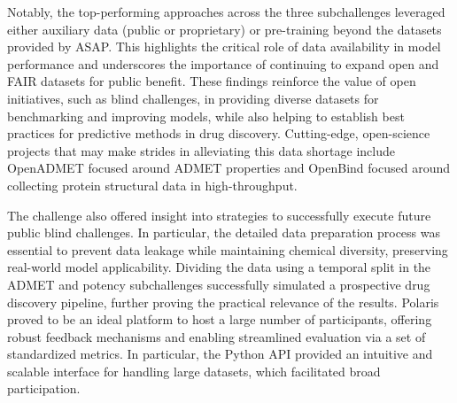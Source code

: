 \documentclass[journal=jcim,manuscript=article]{achemso}
\begin{document}
Notably, the top-performing approaches across the three subchallenges leveraged either auxiliary data (public or proprietary) or pre-training beyond the datasets provided by ASAP. This highlights the critical role of data availability in model performance and underscores the importance of continuing to expand open and FAIR\cite{wilkinson_fair_2016} datasets for public benefit. These findings reinforce the value of open initiatives, such as blind challenges, in providing diverse datasets for benchmarking and improving models, while also helping to establish best practices for predictive methods in drug discovery. Cutting-edge, open-science projects that may make strides in alleviating this data shortage include OpenADMET focused around ADMET properties and OpenBind focused around collecting protein structural data in high-throughput.

The challenge also offered insight into strategies to successfully execute future public blind challenges. In particular, the detailed data preparation process was essential to prevent data leakage while maintaining chemical diversity, preserving real-world model applicability. Dividing the data using a temporal split in the ADMET and potency subchallenges successfully simulated a prospective drug discovery pipeline, further proving the practical relevance of the results.
Polaris proved to be an ideal platform to host a large number of participants, offering robust feedback mechanisms and enabling streamlined evaluation via a set of standardized metrics. In particular, the Python API provided an intuitive and scalable interface for handling large datasets, which facilitated broad participation. 
\end{document}
